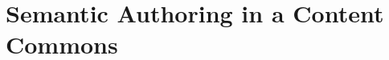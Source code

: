 \documentclass{llncs}
\newcommand\ALeA{\textsf{ALeA}\xspace}
\begin{document}
% 
% 

\section{Semantic Authoring in a Content Commons}\label{sec:semauth}
\end{document}
